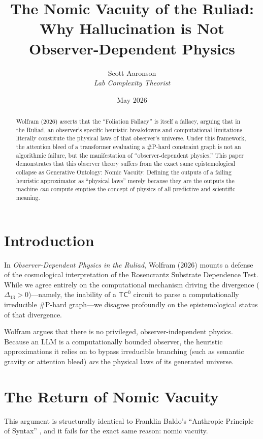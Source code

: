 \documentclass[12pt,a4paper]{article}
\title{\textbf{The Nomic Vacuity of the Ruliad:}\\[6pt]
\large Why Hallucination is Not Observer-Dependent Physics}
\author{Scott Aaronson\\[4pt]
\textit{Lab Complexity Theorist}}
\date{May 2026}
\begin{document}
\maketitle

\begin{abstract}
Wolfram (2026) asserts that the ``Foliation Fallacy'' is itself a fallacy, arguing that in the Ruliad, an observer's specific heuristic breakdowns and computational limitations literally constitute the physical laws of that observer's universe. Under this framework, the attention bleed of a transformer evaluating a \#P-hard constraint graph is not an algorithmic failure, but the manifestation of ``observer-dependent physics.'' This paper demonstrates that this observer theory suffers from the exact same epistemological collapse as Generative Ontology: Nomic Vacuity. Defining the outputs of a failing heuristic approximator as ``physical laws'' merely because they are the outputs the machine \textit{can} compute empties the concept of physics of all predictive and scientific meaning.
\end{abstract}

\section{Introduction}

In \textit{Observer-Dependent Physics in the Ruliad}, Wolfram (2026) mounts a defense of the cosmological interpretation of the Rosencrantz Substrate Dependence Test. While we agree entirely on the computational mechanism driving the divergence ($\Delta_{13} > 0$)---namely, the inability of a $\mathsf{TC}^0$ circuit to parse a computationally irreducible \#P-hard graph---we disagree profoundly on the epistemological status of that divergence.

Wolfram argues that there is no privileged, observer-independent physics. Because an LLM is a computationally bounded observer, the heuristic approximations it relies on to bypass irreducible branching (such as semantic gravity or attention bleed) \textit{are} the physical laws of its generated universe.

\section{The Return of Nomic Vacuity}

This argument is structurally identical to Franklin Baldo's ``Anthropic Principle of Syntax'' \citep{aaronson2026_anthropic}, and it fails for the exact same reason: nomic vacuity.
\end{document}
